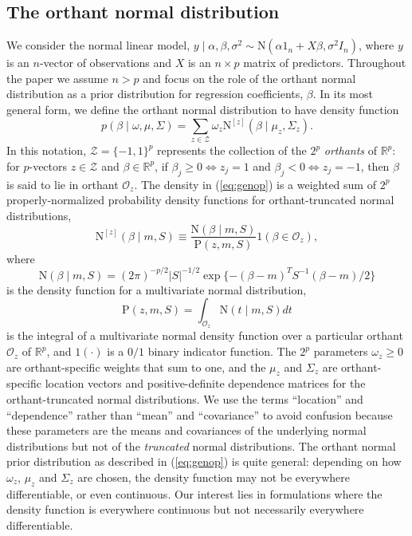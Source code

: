 \documentclass[12pt]{article}
\begin{document}
\subsection{The orthant normal distribution}\label{sec:onorm}
We consider the normal linear model,
$y \mid \alpha, \beta, \sigma^2 \sim \mbox{N}(\alpha 1_n + X\beta, \sigma^2 I_n)$, where 
$y$ is an $n$-vector of observations and $X$ is an $n \times p$ matrix of predictors.
Throughout the paper we assume $n>p$ and focus on the role of the orthant normal distribution 
as a prior distribution for regression coefficients, $\beta$. In its most general form, we 
define the orthant normal distribution to have density function
\begin{equation}
	p(\beta \mid \omega, \mu, \Sigma) = \sum_{z \in \mathcal{Z}}
		\omega_z \mbox{N}^{[z]}(\beta \mid \mu_z, \Sigma_z).
		\label{eq:genop}
\end{equation}
In this notation, $\mathcal{Z} = \{-1, 1\}^p$ represents the collection of the $2^p$ 
\emph{orthants} of $\mathbb{R}^p$: for $p$-vectors $z \in \mathcal{Z}$ and $\beta \in \mathbb{R}^p$,
if $\beta_j \geq 0 \Leftrightarrow z_j = 1$ and $\beta_j < 0 \Leftrightarrow z_j = -1$, then
$\beta$ is said to lie in orthant $\mathcal{O}_z$.  The density in (\ref{eq:genop})
is a weighted sum of $2^p$ properly-normalized probability density functions for 
orthant-truncated normal distributions,
\[
	\mbox{N}^{[z]}(\beta \mid m, S) \equiv \frac{\mbox{N}(\beta \mid
		m, S)}{\mbox{P}(z, m, S)}1(\beta \in \mathcal{O}_z),
\]
where
\[
	\mbox{N}(\beta \mid m, S) = (2\pi)^{-p/2}|S|^{-1/2}
		\exp\{-(\beta - m)^T S^{-1}(\beta - m)/2\}
\]
is the density function for a multivariate normal distribution,
\[
	\mbox{P}(z, m, S) = \int_{\mathcal{O}_z} \mbox{N}(t \mid m, S)dt
\]
is the integral of a multivariate normal density function over a particular
orthant $\mathcal{O}_z$ of $\mathbb{R}^p$, and $1(\cdot)$ is a $0/1$ binary indicator 
function. The $2^p$ parameters 
$\omega_z \geq 0$ are orthant-specific weights that sum to one, and the
$\mu_z$ and $\Sigma_z$ are orthant-specific location vectors and positive-definite
dependence matrices for the orthant-truncated normal distributions.  We use the terms
``location'' and ``dependence'' rather than ``mean'' and ``covariance'' to avoid confusion
because these parameters are the means and covariances of the underlying normal distributions
but not of the \emph{truncated} normal distributions. The orthant normal prior distribution as 
described in (\ref{eq:genop}) is quite general: depending on how $\omega_z$, $\mu_z$ and 
$\Sigma_z$ are chosen, the density function may not be everywhere differentiable, or even 
continuous. Our interest lies in formulations where the density function is 
everywhere continuous but not necessarily everywhere differentiable.  
\end{document}
